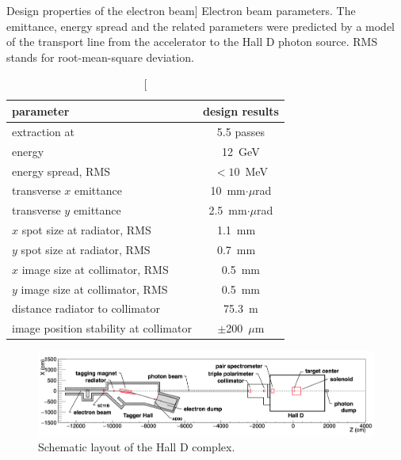 \begin{table}[tbp]
\begin{center}
\caption
[Design properties of the electron beam]
{Electron beam parameters. The emittance, energy spread and
the related parameters were
predicted by a model of the transport line from
the accelerator to the Hall D photon source. RMS stands for root-mean-square deviation.}
\label{tab:elecprop}
\begin{tabular}{|l|c|}
\hline\hline
parameter & design results \\
\hline
extraction at & 5.5 passes \\
energy & 12~GeV \\
energy spread, RMS & $<10$~MeV \\
transverse $x$ emittance & 10~mm$\cdot\mu$rad \\
transverse $y$ emittance & 2.5~mm$\cdot\mu$rad \\
$x$ spot size at radiator, RMS & 1.1~mm \ \\
$y$ spot size at radiator, RMS & 0.7~mm \ \\
$x$ image size at collimator, RMS & 0.5~mm \\
$y$ image size at collimator, RMS & 0.5~mm \\
distance radiator to collimator & 75.3~m \\
image position stability at collimator & $\pm$200~$\mu$m \\
\hline\hline
\end{tabular}
\end{center}
\end{table}



\begin{figure}[t]
\begin{center}
 \includegraphics[clip=true,width=0.98\linewidth]{figures/Draw_beamline.png}
\end{center}
\caption{Schematic layout of the Hall D complex.
        }
\label{fig:beam:Draw_beamline} 
\end{figure}

